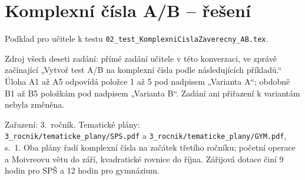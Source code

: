 \documentclass[a4paper,10pt]{article}
\begin{document}
\section*{Komplexní čísla A/B -- řešení}
Podklad pro učitele k testu \texttt{02\_test\_KomplexniCislaZaverecny\_AB.tex}.

Zdroj všech deseti zadání: přímé zadání učitele v této konverzaci,
ve zprávě začínající „Vytvoř test A/B na komplexní čísla podle následujících příkladů.“
Úloha A1 až A5 odpovídá položce 1 až 5 pod nadpisem „Varianta A“;
obdobně B1 až B5 položkám pod nadpisem „Varianta B“.
Zadání ani přiřazení k variantám nebyla změněna.

Zařazení: 3.~ročník. Tematické plány:\\
\texttt{3\_rocnik/tematicke\_plany/SPS.pdf} a
\texttt{3\_rocnik/tematicke\_plany/GYM.pdf}, s.~1.
Oba plány řadí komplexní čísla na začátek třetího ročníku;
početní operace a Moivreovu větu do září, kvadratické rovnice do října.
Zářijová dotace činí 9 hodin pro SPŠ a 12 hodin pro gymnázium.
\end{document}
